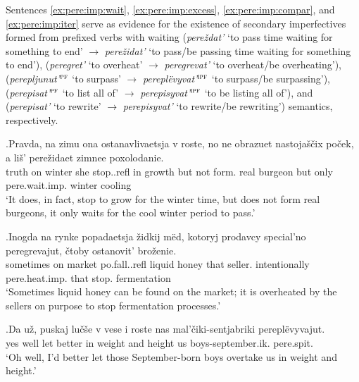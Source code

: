 Sentences \ref{ex:pere:imp:wait}, \ref{ex:pere:imp:excess}, \ref{ex:pere:imp:compar}, and \ref{ex:pere:imp:iter} serve as evidence for the existence of secondary imperfectives formed from prefixed verbs with waiting (\textit{pere\v{z}dat'} `to pass time waiting for something to end' $\rightarrow$ \textit{pere\v{z}idat'}  `to pass/be passing time waiting for something to end'),  (\textit{peregret'} `to overheat' $\rightarrow$ \textit{peregrevat'} `to overheat/be overheating'),  (\textit{perepljunut'$^{\textsc{pf}}$} `to surpass' $\rightarrow$ \textit{perepl\"{e}vy\-vat'$^{\textsc{ipf}}$} `to surpass/be surpassing'),  (\textit{perepisat'$^{\textsc{pf}}$} `to list all of' $\rightarrow$ \textit{pere\-pisyvat'$^{\textsc{ipf}}$} `to be listing all of'), and  (\textit{perepisat'} `to rewrite' $\rightarrow$ \textit{perepisyvat'} `to rewrite/be rewriting') semantics, respectively.\largerpage[2]

\exg.\label{ex:pere:imp:wait}Pravda, na zimu ona ostanavlivaetsja v roste, no ne obrazuet nastoja\v{s}\v{c}ix po\v{c}ek, a li\v{s}' pere\v{z}idaet zimnee poxolodanie.\\
truth on winter she stop..refl in growth but not form. real burgeon but only pere.wait.imp. winter cooling\\
\trans `It does, in fact, stop to grow for the winter time, but does not form real burgeons, it only waits for the cool winter period to pass.'\\

\exg.\label{ex:pere:imp:excess}Inogda na rynke popadaetsja \v{z}idkij m\"{e}d, kotoryj prodavcy special'no peregrevajut, \v{c}toby ostanovit' bro\v{z}enie.\\
sometimes on market po.fall..refl liquid honey that seller. intentionally pere.heat.imp. that stop. fermentation\\
`Sometimes liquid honey can be found on the market; it is overheated by the sellers on purpose to stop fermentation processes.'\\

\exg.\label{ex:pere:imp:compar}Da u\v{z}, puskaj lu\v{c}\v{s}e v vese i roste nas mal'\v{c}iki-sentjabriki perepl\"{e}vyvajut.\\
yes well let better in weight and height us boys-september.ik. pere.spit.\\
\trans `Oh well, I'd better let those September-born boys overtake us in weight and height.'


